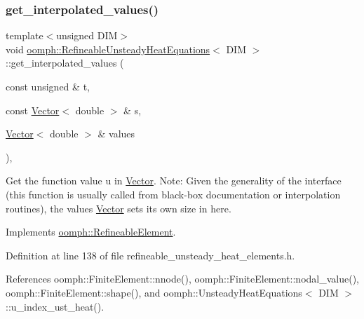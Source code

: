 \subsubsection{\texorpdfstring{get\+\_\+interpolated\+\_\+values()}{get\_interpolated\_values()}\hspace{0.1cm}{\footnotesize\ttfamily [2/2]}}
{\footnotesize\ttfamily template$<$unsigned D\+IM$>$ \\
void \hyperlink{classoomph_1_1RefineableUnsteadyHeatEquations}{oomph\+::\+Refineable\+Unsteady\+Heat\+Equations}$<$ D\+IM $>$\+::get\+\_\+interpolated\+\_\+values (\begin{DoxyParamCaption}\item[{const unsigned \&}]{t,  }\item[{const \hyperlink{classoomph_1_1Vector}{Vector}$<$ double $>$ \&}]{s,  }\item[{\hyperlink{classoomph_1_1Vector}{Vector}$<$ double $>$ \&}]{values }\end{DoxyParamCaption})\hspace{0.3cm}{\ttfamily [inline]}, {\ttfamily [virtual]}}



Get the function value u in \hyperlink{classoomph_1_1Vector}{Vector}. Note\+: Given the generality of the interface (this function is usually called from black-\/box documentation or interpolation routines), the values \hyperlink{classoomph_1_1Vector}{Vector} sets its own size in here. 



Implements \hyperlink{classoomph_1_1RefineableElement_ada6f0efe831ffefb1d2829ce01d45bfc}{oomph\+::\+Refineable\+Element}.



Definition at line 138 of file refineable\+\_\+unsteady\+\_\+heat\+\_\+elements.\+h.



References oomph\+::\+Finite\+Element\+::nnode(), oomph\+::\+Finite\+Element\+::nodal\+\_\+value(), oomph\+::\+Finite\+Element\+::shape(), and oomph\+::\+Unsteady\+Heat\+Equations$<$ D\+I\+M $>$\+::u\+\_\+index\+\_\+ust\+\_\+heat().

\mbox{\label{classoomph_1_1RefineableUnsteadyHeatEquations_a971fdad8f46d54dcc140a57f5b46c05c}} 
